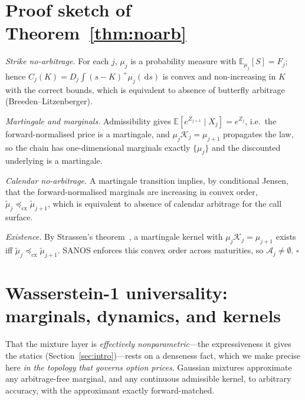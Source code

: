 \documentclass[11pt]{article}
\newcommand{\E}{\mathbb{E}}
\newcommand{\cK}{\mathcal{K}}
\newcommand{\cA}{\mathcal{A}}
\newcommand{\cxle}{\preceq_{\mathrm{cx}}}
\newcommand{\dd}{\,\mathrm{d}}
\begin{document}
\section{Proof sketch of Theorem~\ref{thm:noarb}}
\label{app:proof}

\emph{Strike no-arbitrage.} For each $j$, $\mu_j$ is a probability measure with
$\E_{\mu_j}[S]=F_j$; hence $C_j(K)=D_j\int(s-K)^+\mu_j(\dd s)$ is convex and
non-increasing in $K$ with the correct bounds, which is equivalent to absence of
butterfly arbitrage (Breeden--Litzenberger).

\emph{Martingale and marginals.} Admissibility gives $\E[e^{Z_{j+1}}\mid X_j]=e^{Z_j}$,
i.e.\ the forward-normalised price is a martingale, and $\mu_j\cK_j=\mu_{j+1}$ propagates
the law, so the chain has one-dimensional marginals exactly $\{\mu_j\}$ and the discounted
underlying is a martingale.

\emph{Calendar no-arbitrage.} A martingale transition implies, by conditional Jensen,
that the forward-normalised marginals are increasing in convex order,
$\tilde\mu_j\cxle\tilde\mu_{j+1}$, which is equivalent to absence of calendar
arbitrage for the call surface.

\emph{Existence.} By Strassen's theorem~\cite{strassen1965,beiglbock2013}, a
martingale kernel with $\mu_j\cK_j=\mu_{j+1}$ exists iff $\tilde\mu_j\cxle\tilde\mu_{j+1}$.
SANOS enforces this convex order across maturities, so $\cA_j\neq\emptyset$. \hfill$\square$

\section{Wasserstein-1 universality: marginals, dynamics, and kernels}
\label{app:density}

That the mixture layer is \emph{effectively nonparametric}---the expressiveness it gives
the statics (Section~\ref{sec:intro})---rests on a denseness fact, which we make precise here
\emph{in the topology that governs option prices}. Gaussian mixtures approximate any
arbitrage-free marginal, and any continuous admissible kernel, to arbitrary accuracy, with the
approximant exactly forward-matched.
\end{document}

